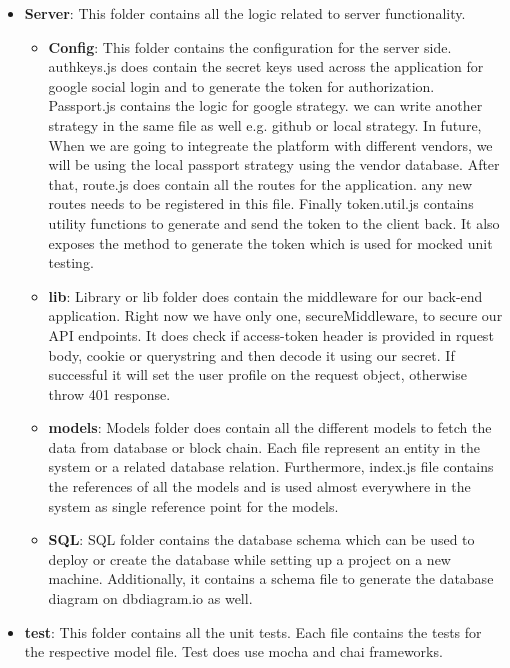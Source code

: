 \begin{itemize}

\item {\textbf{Server}}: This folder contains all the logic related to server functionality. 
\begin{itemize}
\item {\textbf{Config}}: This folder contains the configuration for the server side. authkeys.js does contain the secret keys used across the application for google social login and to generate the token for authorization. Passport.js contains the logic for google strategy. we can write another strategy in the same file as well e.g. github or local strategy. In future, When we are going to integreate the platform with different vendors, we will be using the local passport strategy using the vendor database. After that, route.js does contain all the routes for the application. any new routes needs to be registered in this file. Finally token.util.js contains utility functions to generate and send the token to the client back. It also exposes the method to generate the token which is used for mocked unit testing. 

\item {\textbf{lib}}: Library or lib folder does contain the middleware for our back-end application. Right now we have only one, secureMiddleware, to secure our API endpoints. It does check if access-token header is provided in rquest body, cookie or querystring and then decode it using our secret. If successful it will set the user profile on the request object, otherwise throw 401 response. 

\item {\textbf{models}}: Models folder does contain all the different models to fetch the data from database or block chain. Each file represent an entity in the system or a related database relation.  Furthermore, index.js file contains the references of all the models and is used almost everywhere in the system as single reference point for the models. 

\item {\textbf{SQL}}: SQL folder contains the database schema which can be used to deploy or create the database while setting up a project on a new machine. Additionally, it contains a schema file to generate the database diagram on dbdiagram.io as well. 
\end{itemize}


\item {\textbf{test}}: This folder contains all the unit tests. Each file contains the tests for the respective model file. Test does use mocha and chai frameworks.


\end{itemize}
